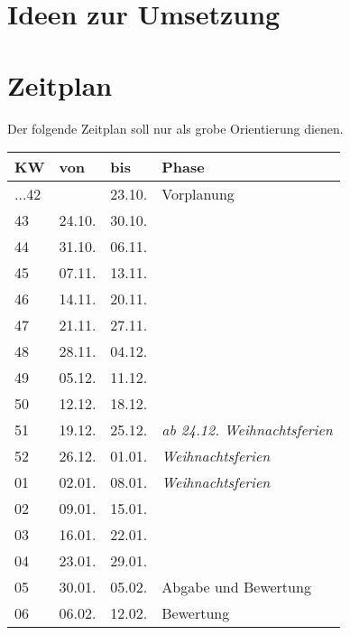\documentclass[a4paper,12pt]{article}
\begin{document}
\section{Ideen zur Umsetzung}


\section{Zeitplan}

Der folgende Zeitplan soll nur als grobe Orientierung dienen.\\

\begin{center}
  \begin{tabular}{llll}
    \textbf{KW} & \textbf{von} & \textbf{bis} & \textbf{Phase}\\
    \hline
    ...42 &  & 23.10. & Vorplanung\\ 
    \hline
    43 & 24.10. & 30.10. & \\
    \hline
    44 & 31.10. & 06.11. & \\
    \hline
    45 & 07.11. & 13.11. & \\
    \hline
    46 & 14.11. & 20.11. & \\
    \hline
    47 & 21.11. & 27.11. & \\
    \hline
    48 & 28.11. & 04.12. & \\ 
    \hline
    49 & 05.12. & 11.12. & \\
    \hline
    50 & 12.12. & 18.12. & \\
    \hline
    51 & 19.12. & 25.12. & \emph{ab 24.12. Weihnachtsferien}\\
    \hline
    52 & 26.12. & 01.01. & \emph{Weihnachtsferien}\\
    \hline
    01 & 02.01. & 08.01. & \emph{Weihnachtsferien}\\
    \hline
    02 & 09.01. & 15.01. & \\
    \hline
    03 & 16.01. & 22.01. & \\
    \hline
    04 & 23.01. & 29.01. & \\
    \hline
    05 & 30.01. & 05.02. & Abgabe und Bewertung\\
    \hline
    06 & 06.02. & 12.02. & Bewertung\\
    \hline
  \end{tabular}
\end{center}


\end{document}
